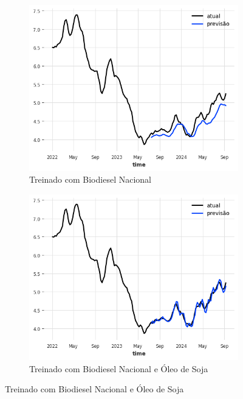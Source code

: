 \begin{figure}[htbp]
	\centering
	\begin{subfigure}[b]{0.45\textwidth}
		\centering
		\includegraphics[width=\textwidth]{figuras/nhits_takens_brasil_plot.png} %
		\caption{Treinado com Biodiesel Nacional \newline}
		\label{fig:nhits_takens_brasil_plot}
	\end{subfigure}
	\hfill
	\begin{subfigure}[b]{0.45\textwidth}
		\centering
		\includegraphics[width=\textwidth]{figuras/nhits_takens_brasil_oil_plot.png} %
		\caption{Treinado com Biodiesel Nacional e Óleo de Soja}
		\label{fig:nhits_takens_brasil_oil_plot}
	\end{subfigure}


\end{figure}
